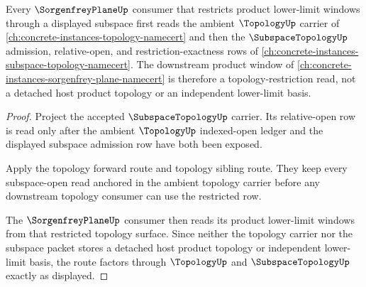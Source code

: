 \begin{proposition}
\label{prop:subspace-topology-sorgenfrey-plane-dependency-route}
Every $\SorgenfreyPlaneUp$ consumer that restricts product lower-limit windows through a displayed subspace first reads the ambient $\TopologyUp$ carrier of \autoref{ch:concrete-instances-topology-namecert} and then the $\SubspaceTopologyUp$ admission, relative-open, and restriction-exactness rows of \autoref{ch:concrete-instances-subspace-topology-namecert}. The downstream product window of \autoref{ch:concrete-instances-sorgenfrey-plane-namecert} is therefore a topology-restriction read, not a detached host product topology or an independent lower-limit basis.
\end{proposition}
\begin{proof}
Project the accepted $\SubspaceTopologyUp$ carrier. Its relative-open row is read only after the ambient $\TopologyUp$ indexed-open ledger and the displayed subspace admission row have both been exposed.

Apply the topology forward route and topology sibling route. They keep every subspace-open read anchored in the ambient topology carrier before any downstream topology consumer can use the restricted row.

The $\SorgenfreyPlaneUp$ consumer then reads its product lower-limit windows from that restricted topology surface. Since neither the topology carrier nor the subspace packet stores a detached host product topology or independent lower-limit basis, the route factors through $\TopologyUp$ and $\SubspaceTopologyUp$ exactly as displayed.
\end{proof}
